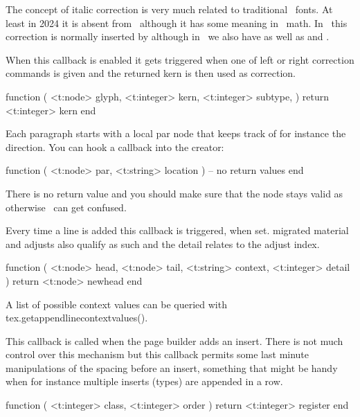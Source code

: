 The concept of italic correction is very much related to traditional \TEX\ fonts.
At least in 2024 it is absent from \OPENTYPE\ although it has some meaning in
\OPENTYPE\ math. In \TEX\ this correction is normally inserted by \type {\/}
although in \LUAMETATEX\ we also have \typ {\explicititaliccorrection} as well as
\typ {\forcedleftcorrection} and \typ {\forcedrightcorrection}.

When this callback is enabled it gets triggered when one of left or right
correction commands is given and the returned kern is then used as correction.

\starttyping[option=LUA]
function (
    <t:node>    glyph,
    <t:integer> kern,
    <t:integer> subtype,
)
    return <t:integer> kern
end
\stoptyping

\stopsubsection

\startsubsection[title=insert_par]

Each paragraph starts with a local par node that keeps track of for instance
the direction. You can hook a callback into the creator:

\starttyping[option=LUA]
function (
    <t:node>   par,
    <t:string> location
)
    -- no return values
end
\stoptyping

There is no return value and you should make sure that the node stays valid
as otherwise \TEX\ can get confused.

\stopsubsection

\startsubsection[title=append_line]

Every time a line is added this callback is triggered, when set. migrated
material and adjusts also qualify as such and the detail relates to the adjust
index.

\starttyping[option=LUA]
function (
    <t:node>    head,
    <t:node>    tail,
    <t:string>  context,
    <t:integer> detail
)
    return <t:node> newhead
end
\stoptyping

A list of possible context values can be queried with \typ
{tex.getappendlinecontextvalues()}.

\stopsubsection

\startsubsection[title=insert_distance]

This callback is called when the page builder adds an insert. There is not much
control over this mechanism but this callback permits some last minute
manipulations of the spacing before an insert, something that might be handy when
for instance multiple inserts (types) are appended in a row.

\starttyping[option=LUA]
function (
    <t:integer> class,
    <t:integer> order
)
    return <t:integer> register
end
\stoptyping

